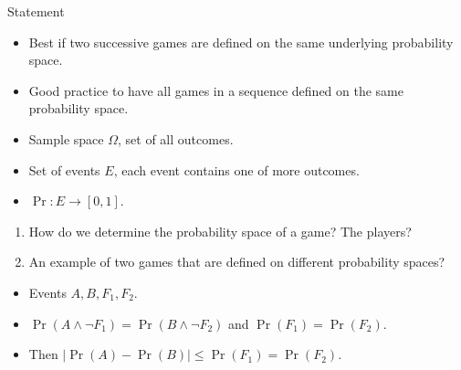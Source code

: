 \begin{frame}
  \begin{block}{Statement}
    \begin{itemize}
      \item Best if two successive games are defined on the same underlying 
        probability space.

      \item Good practice to have all games in a sequence defined on the same 
        probability space.
    \end{itemize}
  \end{block}

  \begin{definition}
    \begin{itemize}
      \item Sample space \(\Omega\), set of all outcomes.
      \item Set of events \(E\), each event contains one of more outcomes.
      \item \(\Pr\colon E\to [0, 1]\).
    \end{itemize}
  \end{definition}
\end{frame}

\begin{frame}
  \begin{question}
    \begin{enumerate}
      \item How do we determine the probability space of a game?
        The players?

      \item\label{ExampleDifferentSpaces} An example of two games that are 
        defined on different probability spaces?
    \end{enumerate}
  \end{question}

  \begin{example}
    \begin{itemize}
      \item Events \(A, B, F_1, F_2\).
      \item \(\Pr(A\land \lnot F_1) = \Pr(B\land \lnot F_2)\) and \(\Pr(F_1) 
          = \Pr(F_2)\).
      \item Then \(|\Pr(A) - \Pr(B)|\leq \Pr(F_1) = \Pr(F_2)\).
    \end{itemize}
  \end{example}
\end{frame}

